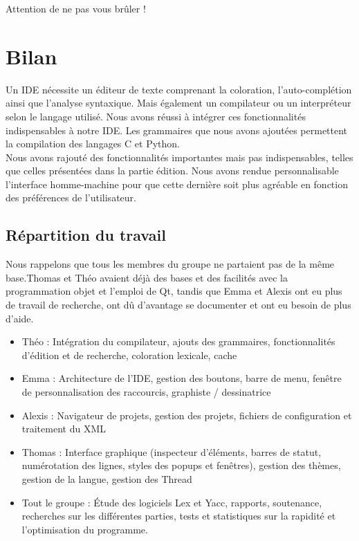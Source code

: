 \documentclass[a4paper,12pt]{article}
\begin{document}
	Attention de ne pas vous brûler !

\section{Bilan}

Un IDE nécessite un éditeur de texte comprenant la coloration, l'auto-complétion ainsi que l'analyse syntaxique. Mais également un compilateur ou un interpréteur selon le langage utilisé. Nous avons réussi à intégrer ces fonctionnalités indispensables à notre IDE. Les grammaires que nous avons ajoutées permettent la compilation des langages C et Python.\\

Nous avons rajouté des fonctionnalités importantes mais pas indispensables, telles que celles présentées dans la partie édition. Nous avons rendue personnalisable l'interface homme-machine pour que cette dernière soit plus agréable en fonction des préférences de l'utilisateur.

\subsection{Répartition du travail}

	Nous rappelons que tous les membres du groupe ne partaient pas de la même base.Thomas et Théo avaient déjà des bases et des facilités avec la programmation objet et l'emploi de Qt, tandis que Emma et Alexis ont eu plus de travail de recherche, ont dû d'avantage se documenter et ont eu besoin de plus d'aide.

	\begin{itemize}
		\item Théo : Intégration du compilateur, ajouts des grammaires, fonctionnalités d'édition et de recherche, coloration lexicale, cache
		\item Emma : Architecture de l'IDE, gestion des boutons, barre de menu, fenêtre de personnalisation des raccourcis, graphiste / dessinatrice
		\item Alexis : Navigateur de projets, gestion des projets, fichiers de configuration et traitement du XML
		\item Thomas : Interface graphique (inspecteur d'éléments, barres de statut, numérotation des lignes, styles des popups et fenêtres), gestion des thèmes, gestion de la langue, gestion des Thread
		\item Tout le groupe : Étude des logiciels Lex et Yacc, rapports, soutenance, recherches sur les différentes parties, tests et statistiques sur la rapidité et l'optimisation du programme.
	\end{itemize}
	
\end{document}
